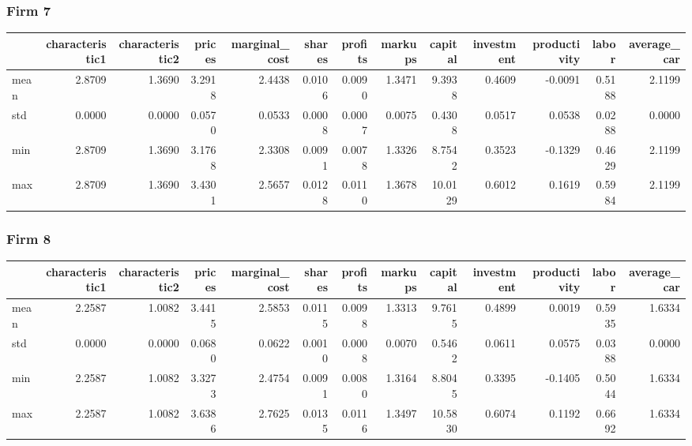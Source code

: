  \subsubsection*{Firm 7}
\begin{tabular}{lrrrrrrrrrrrr}
\toprule
{} &  characteristic1 &  characteristic2 &  prices &  marginal\_cost &  shares &  profits &  markups &  capital &  investment &  productivity &  labor &  average\_car \\
\midrule
mean &           2.8709 &           1.3690 &  3.2918 &         2.4438 &  0.0106 &   0.0090 &   1.3471 &   9.3938 &      0.4609 &       -0.0091 & 0.5188 &       2.1199 \\
std  &           0.0000 &           0.0000 &  0.0570 &         0.0533 &  0.0008 &   0.0007 &   0.0075 &   0.4308 &      0.0517 &        0.0538 & 0.0288 &       0.0000 \\
min  &           2.8709 &           1.3690 &  3.1768 &         2.3308 &  0.0091 &   0.0078 &   1.3326 &   8.7542 &      0.3523 &       -0.1329 & 0.4629 &       2.1199 \\
max  &           2.8709 &           1.3690 &  3.4301 &         2.5657 &  0.0128 &   0.0110 &   1.3678 &  10.0129 &      0.6012 &        0.1619 & 0.5984 &       2.1199 \\
\bottomrule
\end{tabular}


 \subsubsection*{Firm 8}
\begin{tabular}{lrrrrrrrrrrrr}
\toprule
{} &  characteristic1 &  characteristic2 &  prices &  marginal\_cost &  shares &  profits &  markups &  capital &  investment &  productivity &  labor &  average\_car \\
\midrule
mean &           2.2587 &           1.0082 &  3.4415 &         2.5853 &  0.0115 &   0.0098 &   1.3313 &   9.7615 &      0.4899 &        0.0019 & 0.5935 &       1.6334 \\
std  &           0.0000 &           0.0000 &  0.0680 &         0.0622 &  0.0010 &   0.0008 &   0.0070 &   0.5462 &      0.0611 &        0.0575 & 0.0388 &       0.0000 \\
min  &           2.2587 &           1.0082 &  3.3273 &         2.4754 &  0.0091 &   0.0080 &   1.3164 &   8.8045 &      0.3395 &       -0.1405 & 0.5044 &       1.6334 \\
max  &           2.2587 &           1.0082 &  3.6386 &         2.7625 &  0.0135 &   0.0116 &   1.3497 &  10.5830 &      0.6074 &        0.1192 & 0.6692 &       1.6334 \\
\bottomrule
\end{tabular}


